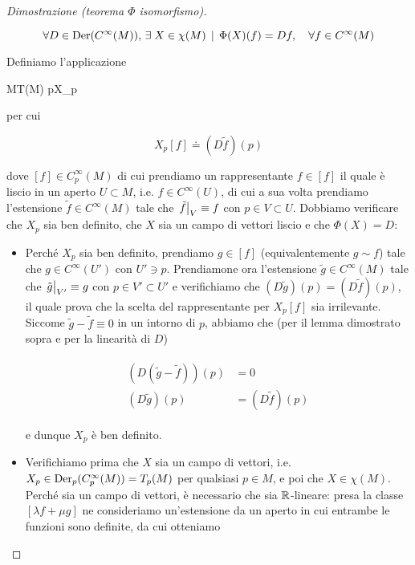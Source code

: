 \begin{proof}[Dimostrazione (teorema $ \Phi $ isomorfismo)]
\begin{itemize}
	\begin{equation}
		\forall D \in \der(C^{\infty}(M)), \, \E X \in \chi(M) \, \mid \, \Phi(X)(f) = D f \qcomma \forall f \in C^{\infty}(M)
	\end{equation}
	
	Definiamo l'applicazione
	
		{M}{T(M)}
		{p}{X_{p}}

	per cui
	
	\begin{equation}
		X_{p} [f] \doteq (D \tilde{f})(p)
	\end{equation}

	dove $ [f] \in C_{p}^{\infty}(M) $ di cui prendiamo un rappresentante $ f \in [f] $ il quale è liscio in un aperto $ U \subset M $, i.e. $ f \in C^{\infty}(U) $, di cui a sua volta prendiamo l'estensione $ \tilde{f} \in C^{\infty}(M) $ tale che $ \eval{\tilde{f}}_{V} \equiv f $ con $ p \in V \subset U $. Dobbiamo verificare che $ X_{p} $ sia ben definito, che $ X $ sia un campo di vettori liscio e che $ \Phi(X) = D $:
	
	\begin{itemize}
		\item Perché $ X_{p} $ sia ben definito, prendiamo $ g \in [f] $ (equivalentemente $ g \sim f $) tale che $ g \in C^{\infty}(U') $ con $ U' \ni p $. Prendiamone ora l'estensione $ \tilde{g} \in C^{\infty}(M) $ tale che $ \eval{\tilde{g}}_{V'} \equiv g $ con $ p \in V' \subset U' $ e verifichiamo che $ (D \tilde{g})(p) = (D \tilde{f})(p) $, il quale prova che la scelta del rappresentante per $ X_{p} [f] $ sia irrilevante. Siccome $ \tilde{g} - \tilde{f} \equiv 0 $ in un intorno di $ p $, abbiamo che (per il lemma dimostrato sopra e per la linearità di $ D $)
		
		\begin{align}
			\begin{split}
				(D (\tilde{g} - \tilde{f}))(p) &= 0 \\
				(D \tilde{g})(p) &= (D \tilde{f})(p)
			\end{split}
		\end{align}
		
		e dunque $ X_{p} $ è ben definito.
		
		\item Verifichiamo prima che $ X $ sia un campo di vettori, i.e. $ X_{p} \in \operatorname{Der}_{p}(C_{p}^{\infty}(M)) = T_{p}(M) $ per qualsiasi $ p \in M $, e poi che $ X \in \chi(M) $. Perché sia un campo di vettori, è necessario che sia $ \mathbb{R} $-lineare: presa la classe $ [\lambda f + \mu g] $ ne consideriamo un'estensione da un aperto in cui entrambe le funzioni sono definite, da cui otteniamo
		

\end{itemize}
\end{itemize}
\end{proof}
